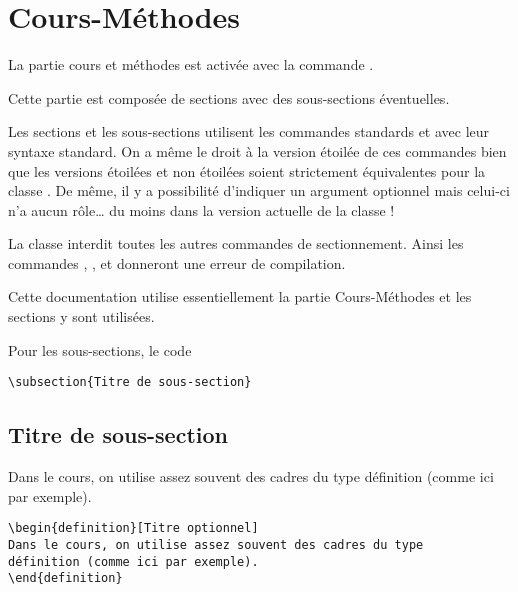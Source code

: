\documentclass[nocrop]{sesamanuel}
\begin{document}
\section{Cours-Méthodes}
\label{sec-cours-methodes}
La partie cours et méthodes est activée avec la commande
. 
\renewcommand{\StringDOCUMENTATION}{Sectionnement}
\begin{documentation}
Cette partie est composée de sections avec des
sous-sections éventuelles. 

Les sections et les sous-sections utilisent les commandes standards
 et  avec leur syntaxe standard. On a
même le droit à la version étoilée de ces commandes bien que les
versions étoilées et non étoilées soient strictement équivalentes pour
la classe . De même, il y a possibilité d'indiquer un
argument optionnel mais celui-ci n'a aucun rôle\ldots{} du moins dans
la version actuelle de la classe !

La classe interdit toutes les autres commandes de sectionnement. Ainsi
les commandes , ,  et
 donneront une erreur de compilation.

Cette documentation utilise essentiellement la partie Cours-Méthodes et les
sections y sont utilisées. 
\end{documentation}

Pour les sous-sections, le code

\begin{code}
\begin{verbatim}
\subsection{Titre de sous-section}
\end{verbatim}
\end{code}
\begin{result}
 
\end{result}

\subsection{Titre de sous-section}
\vfill\clearpage
\begin{definition}
Dans le cours, on utilise assez souvent des cadres du type
définition (comme ici par exemple).  
\end{definition}

\begin{code}
\begin{verbatim}
\begin{definition}[Titre optionnel]
Dans le cours, on utilise assez souvent des cadres du type
définition (comme ici par exemple).  
\end{definition}
\end{verbatim}
\end{code}
\end{document}
